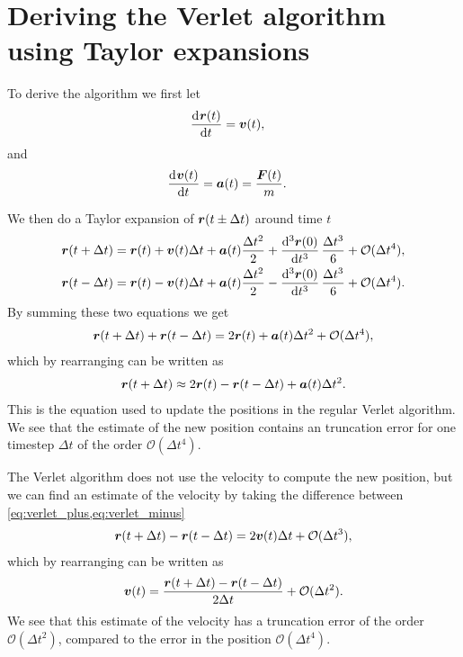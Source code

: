 \section{Deriving the Verlet algorithm using Taylor expansions\label{appendix:verlet_taylor}}

To derive the algorithm we first let
\begin{align*}
    \dod{\rvec(t)}{t} &= \vvec(t),
\end{align*}
and
\begin{align*}
    \dod{\vvec(t)}{t} &= \avec(t) = \frac{\Fvec(t)}{m}.
\end{align*}

We then do a Taylor expansion of $\boldsymbol{r}(t \pm \Delta t)$ around time $t$
\begin{align}
    \rvec(t + \Delta t) &= \rvec(t) + \vvec(t)\Delta t + \avec(t)\frac{\Delta t^2}{2} + \dod[3]{\rvec(0)}{t}\frac{\Delta t^3}{6} + \mathcal{O}(\Delta t^4), \label{eq:verlet_plus}\\
    \rvec(t - \Delta t) &= \rvec(t) - \vvec(t)\Delta t + \avec(t)\frac{\Delta t^2}{2} - \dod[3]{\rvec(0)}{t}\frac{\Delta t^3}{6} + \mathcal{O}(\Delta t^4).\label{eq:verlet_minus}
\end{align}
By summing these two equations we get
\begin{align*}
    \boldsymbol{r}(t + \Delta t) + \boldsymbol{r}(t - \Delta t) = 2\boldsymbol{r}(t) + \boldsymbol{a}(t)\Delta t^2 + \mathcal{O}(\Delta t^4),
\end{align*}
which by rearranging can be written as
\begin{align*}
    \boldsymbol{r}(t + \Delta t) \approx 2\boldsymbol{r}(t) - \boldsymbol{r}(t - \Delta t) + \boldsymbol{a}(t)\Delta t^2.
\end{align*}
This is the equation used to update the positions in the regular Verlet algorithm. We see that the estimate of the new position contains an truncation error for one timestep $\Delta t$ of the order $\mathcal{O}(\Delta t^4)$.

The Verlet algorithm does not use the velocity to compute the new position, but we can find an estimate of the velocity by taking the difference between \cref{eq:verlet_plus,eq:verlet_minus}
\begin{align*}
    \boldsymbol{r}(t + \Delta t) - \boldsymbol{r}(t - \Delta t) = 2\boldsymbol{v}(t)\Delta t + \mathcal{O}(\Delta t^3),
\end{align*}
which by rearranging can be written as
\begin{align*}
    \boldsymbol{v}(t) = \frac{\boldsymbol{r}(t + \Delta t) - \boldsymbol{r}(t - \Delta t)}{2\Delta t} + \mathcal{O}(\Delta t^2).
\end{align*}
We see that this estimate of the velocity has a truncation error of the order $\mathcal{O}(\Delta t^2)$, compared to the error in the position $\mathcal{O}(\Delta t^4)$.

